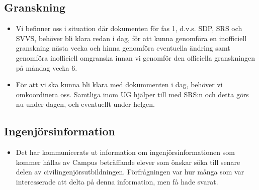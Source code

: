 \documentclass[paper=a4, fontsize=11pt,twoside]{article}
\begin{document}
\subsection{Granskning}
\begin{itemize}
  \item Vi befinner oss i situation där dokumenten för fas 1, d.v.s. SDP, SRS och SVVS, behöver bli klara redan i dag,
  för att kunna genomföra en inofficiell granskning nästa vecka och hinna genomföra eventuella ändring samt 
  genomföra inofficiell omgranska innan vi genomför den officiella granskningen på måndag vecka 6.
  \item För att vi ska kunna bli klara med dokummenten i dag, behöver vi omkoordinera oss. Samtliga inom UG hjälper 
  till med SRS:n och detta görs nu under dagen, och eventuellt under helgen.
\end{itemize}

\subsection{Ingenjörsinformation}
\begin{itemize}
  \item Det har kommunicerats ut information om ingenjörsinformationen som kommer hållas av Campus beträffande
  elever som önskar söka till senare delen av civilingenjörsutbildningen. Förfrågningen var hur många
  som var interesserade att delta på denna information, men få hade svarat.
\end{itemize}
\end{document}
